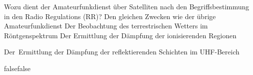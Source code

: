     {Wozu dient der Amateurfunkdienst über Satelliten nach den Begriffsbestimmung in den Radio Regulations (RR)?}
    {Den gleichen Zwecken wie der übrige Amateurfunkdienst}
    {Der Beobachtung des terrestrischen Wetters im Röntgenspektrum}
    {Der Ermittlung der Dämpfung der ionisierenden Regionen}
    {Der Ermittlung der Dämpfung der reflektierenden Schichten im UHF-Bereich

}
    {false}{false}